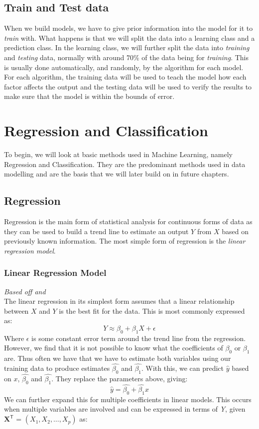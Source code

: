 \documentclass[11pt,a4paper]{report}
\begin{document}
\section{Train and Test data}
When we build models, we have to give prior information into the model for it to \textit{train} with. What happens is that we will split the data into a learning class and a prediction class. In the learning class, we will further split the data into \textit{training} and \textit{testing} data, normally with around 70\% of the data being for \textit{training}. This is usually done automatically, and randomly, by the algorithm for each model.\\
For each algorithm, the training data will be used to teach the model how each factor affects the output and the testing data will be used to verify the results to make sure that the model is within the bounds of error.




\chapter{Regression and Classification}
To begin, we will look at basic methods used in Machine Learning, namely Regression and Classification. They are the predominant methods used in data modelling and are the basis that we will later build on in future chapters.

\section{Regression}
Regression is the main form of statistical analysis for continuous forms of data as they can be used to build a trend line to estimate an output $Y$ from $X$ based on previously known information. The most simple form of regression is the \textit{linear regression model}. 

\subsection{Linear Regression Model}

\textit{Based off \cite[Chapter 3]{ISLR} and \cite[Chapter 3]{ESL}}\\
The linear regression in its simplest form assumes that a linear relationship between $X$ and $Y$ is the best fit for the data. This is most commonly expressed as:
\[Y \approx \beta_0 + \beta_1X + \epsilon \]
Where $\epsilon$ is some constant error term around the trend line from the regression.\\
However, we find that it is not possible to know what the coefficients of $\beta_0$ or $\beta_1$ are. Thus often we have that we have to estimate both variables using our training data to produce estimates $\hat{\beta_0}$ and $\hat{\beta_1}$. With this, we can predict $\hat{y}$ based on $x$, $\hat{\beta_0}$ and $\hat{\beta_1}$. They replace the parameters above, giving:
\[\hat{y} = \hat{\beta_0} + \hat{\beta_1}x\]
We can further expand this for multiple coefficients in linear models. This occurs when multiple variables are involved and can be expressed in terms of \textit{Y}, given $\mathbf{X}^\mathsf{T}$ = \((X_1,X_2,\dots,X_p)\) as:
\end{document}
